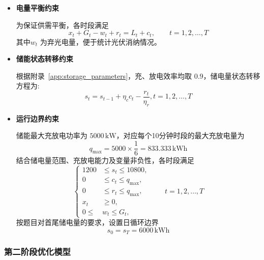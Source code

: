 \begin{itemize}[label=\textbullet]

    \item \textbf{电量平衡约束}

    为保证供需平衡，各时段满足
    \begin{equation}
        x_t+G_t-w_t+r_t=L_t+c_t,
        \qquad t=1,2,\ldots,T
        \label{eq:q1_balance}
    \end{equation}
    其中\(w_t\) 为弃光电量，便于统计光伏消纳情况。

    \item \textbf{储能状态转移约束}

根据附录~\ref{app:storage_parameters}，充、放电效率均取 $0.9$，储电量状态转移方程为:
  \begin{equation}
      s_t
      =
      s_{t-1}
      +\eta_c c_t
      -\frac{r_t}{\eta_r},
      t=1,2,\ldots,T
      \label{eq:q1_soc}
  \end{equation}

  \item \textbf{运行边界约束}

    储能最大充放电功率为 \(5000\,\mathrm{kW}\)，对应每个10分钟时段的最大充放电量为
    \begin{equation}
        q_{\max}
        =5000\times\frac{1}{6}
        =833.333\,\mathrm{kWh}
        \label{eq:q1_qmax}
    \end{equation}
    结合储电量范围、充放电能力及变量非负性，各时段满足
    \begin{equation}
\left\{
\begin{aligned}
    1200&\leq s_t\leq10800,\\
    0&\leq c_t\leq q_{\max},\\
    0&\leq r_t\leq q_{\max},\\
    x_t&\geq0,\\
    0\leq{}&w_t\leq G_t,
\end{aligned}
\right.
\qquad t=1,2,\ldots,T
\label{eq:q1_bounds}
\end{equation}
    按题目对首尾储电量的要求，设置日循环边界
    \begin{equation}
        s_0=s_T=6000\,\mathrm{kWh}
        \label{eq:q1_terminal}
    \end{equation}
\end{itemize}

\subsubsection{第二阶段优化模型}

